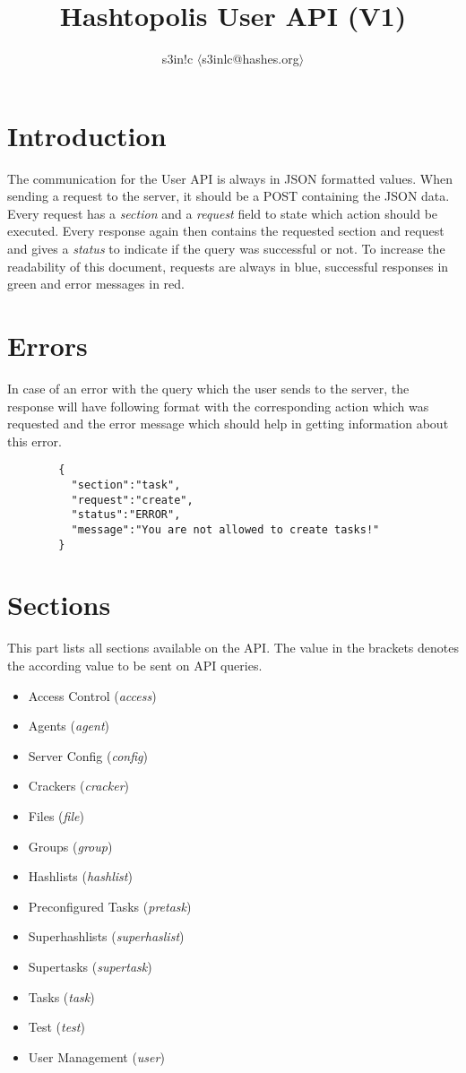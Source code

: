\documentclass{article}
\author{s3in!c $\langle$s3inlc@hashes.org$\rangle$ }
\begin{document}
	\title{Hashtopolis User API (V1)}
	\maketitle
	\section*{Introduction}
	The communication for the User API is always in JSON formatted values. When sending a request to the server, it should be a POST containing the JSON data.
	Every request has a \textit{section} and a \textit{request} field to state which action should be executed. Every response again then contains the requested section and request and gives a \textit{status} to indicate if the query was successful or not. To increase the readability of this document, requests are always in blue, successful responses in green and error messages in red.

	\section*{Errors}
	In case of an error with the query which the user sends to the server, the response will have following format with the corresponding action which was requested and the error message which should help in getting information about this error.
	{	
		\color{BrickRed}
		\begin{verbatim}
		{
		  "section":"task",
		  "request":"create",
		  "status":"ERROR",
		  "message":"You are not allowed to create tasks!"
		}
		\end{verbatim}
	}
	
	\section*{Sections}
	This part lists all sections available on the API. The value in the brackets denotes the according value to be sent on API queries.
	\begin{itemize}
		\item{Access Control (\textit{access})}
		\item{Agents (\textit{agent})}
		\item{Server Config (\textit{config})}
		\item{Crackers (\textit{cracker})}
		\item{Files (\textit{file})}
		\item{Groups (\textit{group})}
		\item{Hashlists (\textit{hashlist})}
		\item{Preconfigured Tasks (\textit{pretask})}
		\item{Superhashlists (\textit{superhaslist})}
		\item{Supertasks (\textit{supertask})}
		\item{Tasks (\textit{task})}
		\item{Test (\textit{test})}
		\item{User Management (\textit{user})}
	\end{itemize}
	\pagebreak
\end{document}
